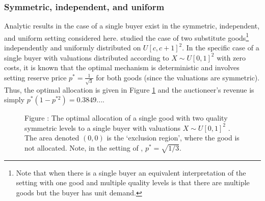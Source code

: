 \documentclass{article}
\newcounter{fig}
\begin{document}
\subsubsection{Symmetric, independent, and uniform}

Analytic results in the case of a single buyer exist in the symmetric, independent, and uniform setting considered here. \autocite{pavlov2011optimal} studied the case of two substitute goods\footnote{Note that when there is a single buyer an equivalent interpretation of the setting with one good and multiple quality levels is that there are multiple goods but the buyer has unit demand.} independently and uniformly distributed on $U[c,c+1]^2$. In the specific case of a single buyer with valuations distributed according to $X \sim U[0,1]^2$ with zero costs, it is known that the optimal mechanism is deterministic and involves setting reserve price $p^* =\frac{1}{\sqrt{3}}$ for both goods (since the valuations are symmetric). Thus, the optimal allocation is given in Figure \ref{fig:pavlov_alloc} and the auctioneer's revenue is simply $p^*( 1 - p^{*2} ) = 0.3849...$.
 
\begin{figure}[H]
    \begin{center}
    \end{center}
  
    \vspace{1mm}
    \raggedright{\small {\sc Figure \thefig\label{fig:pavlov_alloc}:} The optimal allocation of a single good with two quality symmetric levels to a single buyer with valuations $X \sim U[0,1]^2$ \autocite{pavlov2011optimal}. The area denoted $(0,0)$ is the `exclusion region', where the good is not allocated. Note, in the setting of \autocite{pavlov2011optimal}, $p^*=\sqrt{1/3}$.}
\end{figure}
\end{document}
